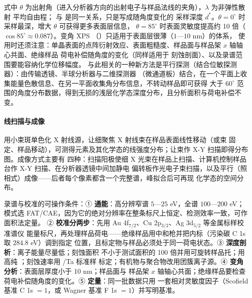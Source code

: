 式中 $\theta$ 为出射角（进入分析器方向的出射电子与样品法线的夹角），$\lambda$ 为非弹性散射
平均自由程； 与  是同一关系，只是写成随角度变化的
采样深度 $d^{*}$。$\theta=0^{\circ}$ 时采样最深，增大 $\theta$ 可获得更多表面层信息，
$\theta=85^{\circ}$ 时表面灵敏度提高约 10 倍（$\cos85^{\circ}\approx0.087$）。变角 XPS
（）只适用于表面层很薄（$1$—$10$ nm）的体系，
使用时还须注意：单晶表面的点阵衍射效应、表面粗糙度、样品面与样品架 $x$ 轴轴心共面、绝缘样品
荷电补偿随角度的变化（同样适用于  刻蚀剖面）、以及录谱范围要能容纳化学位移幅度。
与此相关的一种新方法是平行探测（结合位敏探测器）：由传输透镜、半球分析器与二维探测器
（微通道板）结合，在一个平面上收集能量色散信息、在另一平面收集角分布信息，不转动样品即可获得
大于 $60^{\circ}$ 范围的角度分布数据，得到无损的浅层化学态深度分布，且分析面积与荷电补偿不变。

\paragraph{线扫描与成像}用小束斑单色化 X 射线源，让细聚焦 X 射线束在样品表面线性移动（或束
固定、样品移动），可测得元素及其化学态的线强度分布；让束作 X-Y 扫描即得分布图。成像方式主要有
四种：扫描阳极使细 X 光束在样品上扫描、计算机控制样品台作 X-Y 扫描、在分析器透镜中间加静电
偏转板作光电子束扫描，以及平行（照相式）成像——后者每个像素都含一个完整谱，峰拟合后可再现
化学态的空间分布。

\begin{measure}
录谱与校准的可操作条件：① \textbf{通能}：高分辨窄谱 $5$—$25$ eV，全谱 $100$—$200$ eV；
模式选 FAT/CAE，因为它的绝对分辨率在整条标尺上恒定、检测效率一致，可作面积法定量。
② \textbf{校准分两步}：先用 Au 4f$_{7/2}$、Cu 2p$_{3/2}$、Ag 3d$_{5/2}$ 等金属标样校准谱仪
能量标尺，再处理样品荷电——绝缘样品用中和枪并把内标（污染碳 C 1s 取 $284.8$ eV）调到指定
位置，且标定物与样品必须处于同一荷电状态。③ \textbf{深度剖析}：离子能量尽量低；刻蚀面积
不小于测试面积的 100 倍并用可旋转样品托；用高纯 ；刻蚀速率用 /Ta 标准样
标定；有机物与聚合物改用团簇离子源。④ \textbf{变角分析}：表面层厚度小于 10 nm；样品面与
样品架 $x$ 轴轴心共面；绝缘样品要检查荷电补偿随角度的变化。⑤ \textbf{定量}：同一批数据只用
一套相对灵敏度因子（Scofield 基准 C 1s $=1$，或 Wagner 基准 F 1s $=1$）并写明基准。
\end{measure}

